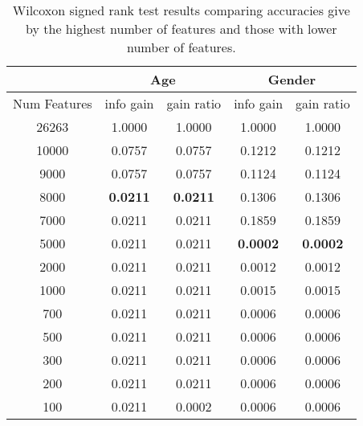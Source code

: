 \documentclass[a4paper]{llncs}
\begin{document}
\begin{table}[!htbp]
\centering
\begin{tabular}{|c|c|c|c|c|}
\hline
                                   & \multicolumn{2}{c|}{Age}          & \multicolumn{2}{c|}{Gender}       \\ \hline
\multicolumn{1}{|l|}{Num Features} & info gain       & gain ratio      & info gain       & gain ratio      \\ \hline
26263                              & 1.0000          & 1.0000          & 1.0000          & 1.0000          \\ \hline
10000                              & 0.0757          & 0.0757          & 0.1212          & 0.1212          \\ \hline
9000                               & 0.0757          & 0.0757          & 0.1124          & 0.1124          \\ \hline
8000                               & \textbf{0.0211} & \textbf{0.0211} & 0.1306          & 0.1306          \\ \hline
7000                               & 0.0211          & 0.0211          & 0.1859          & 0.1859          \\ \hline
5000                               & 0.0211          & 0.0211          & \textbf{0.0002} & \textbf{0.0002} \\ \hline
2000                               & 0.0211          & 0.0211          & 0.0012          & 0.0012          \\ \hline
1000                               & 0.0211          & 0.0211          & 0.0015          & 0.0015          \\ \hline
700                                & 0.0211          & 0.0211          & 0.0006          & 0.0006          \\ \hline
500                                & 0.0211          & 0.0211          & 0.0006          & 0.0006          \\ \hline
300                                & 0.0211          & 0.0211          & 0.0006          & 0.0006          \\ \hline
200                                & 0.0211          & 0.0211          & 0.0006          & 0.0006          \\ \hline
100                                & 0.0211          & 0.0002          & 0.0006          & 0.0006          \\ \hline
\end{tabular}
\caption{Wilcoxon signed rank test results comparing accuracies give by the highest number of features and those with lower number of features.}
\label{table:PValChoosingFeatures}
\end{table}
\end{document}
